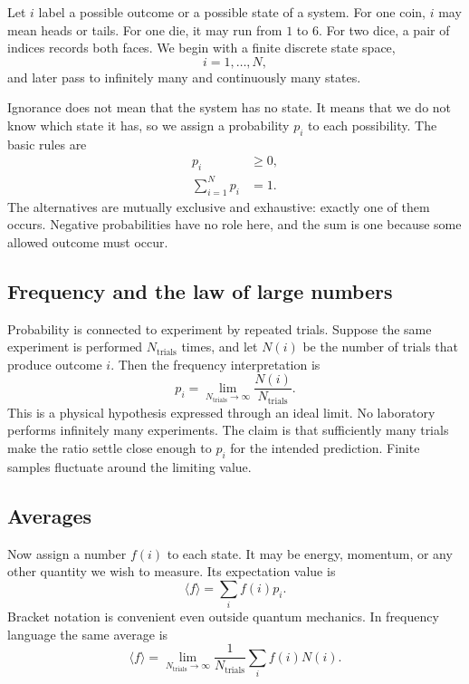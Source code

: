 Let \(i\) label a possible outcome or a possible state of a system. For one
coin, \(i\) may mean heads or tails. For one die, it may run from \(1\) to
\(6\). For two dice, a pair of indices records both faces. We begin with a
finite discrete state space,
\begin{equation}
 i=1,\ldots,N,
\end{equation}
and later pass to infinitely many and continuously many states.

Ignorance does not mean that the system has no state. It means that we do not
know which state it has, so we assign a probability \(p_i\) to each
possibility. The basic rules are
\begin{align}
 p_i &\geq 0, \label{eq:sm1-prob-positive}\\
 \sum_{i=1}^{N}p_i &=1. \label{eq:sm1-prob-normalization}
\end{align}
The alternatives are mutually exclusive and exhaustive: exactly one of them
occurs. Negative probabilities have no role here, and the sum is one because
some allowed outcome must occur.

\subsection{Frequency and the law of large numbers}

Probability is connected to experiment by repeated trials. Suppose the same
experiment is performed \(N_{\mathrm{trials}}\) times, and let \(N(i)\) be
the number of trials that produce outcome \(i\). Then the frequency
interpretation is
\begin{equation}
 p_i=
 \lim_{N_{\mathrm{trials}}\to\infty}
 \frac{N(i)}{N_{\mathrm{trials}}}.
 \label{eq:sm1-frequency}
\end{equation}
This is a physical hypothesis expressed through an ideal limit. No laboratory
performs infinitely many experiments. The claim is that sufficiently many
trials make the ratio settle close enough to \(p_i\) for the intended
prediction. Finite samples fluctuate around the limiting value.

\subsection{Averages}

Now assign a number \(f(i)\) to each state. It may be energy, momentum, or any
other quantity we wish to measure. Its expectation value is
\begin{equation}
 \langle f\rangle=\sum_i f(i)p_i.
 \label{eq:sm1-expectation}
\end{equation}
Bracket notation is convenient even outside quantum mechanics. In frequency
language the same average is
\begin{equation}
 \langle f\rangle
 =
 \lim_{N_{\mathrm{trials}}\to\infty}
 \frac{1}{N_{\mathrm{trials}}}
 \sum_i f(i)N(i).
 \label{eq:sm1-frequency-average}
\end{equation}

